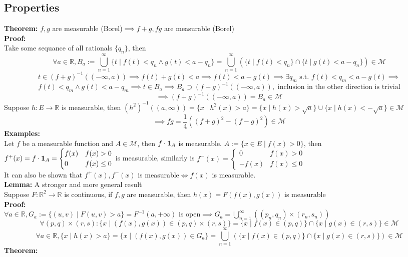 \documentclass{article}
\newcommand{\R}{\mathbb{R}}
\newcommand{\cupninf}{\bigcup\limits_{n=1}^\infty}
\newcommand{\st}{\mbox{ s.t. }}
\newcommand{\0}{{\bf{0}}}
\newcommand{\1}{{\bf{1}}}
\begin{document}
\subsection{Properties}
\textbf{Theorem:} $f,g$ are measurable (Borel)$\implies f+g,fg$ are measurable (Borel)\\
\textbf{Proof:}\\
Take some sequance of all rationals $\{q_n\}$, then
$$\forall a\in\R,B_a:=\cupninf\{t\mid f(t)<q_n\land g(t)<a-q_n\}=\cupninf(\{t\mid f(t)<q_n\}\cap\{t\mid g(t)<a-q_n\})\in\mathcal{M}$$
$$t\in (f+g)^{-1}((-\infty,a))\implies f(t)+g(t)<a\implies f(t)<a-g(t)\implies\exists q_m\st f(t)<q_m<a-g(t)\implies$$
$$f(t)<q_m\land g(t)<a-q_m\implies t\in B_a\implies B_a\supset(f+g)^{-1}((-\infty,a)),\mbox{ inclusion in the other direction is trivial}$$
$$\implies (f+g)^{-1}((-\infty,a))=B_a\in\mathcal{M}$$
Suppose $h:E\to\R$ is measurable, then $\left(h^2\right)^{-1}((a,\infty))=\{x\mid h^2(x)>a\}=\{x\mid h(x)>\sqrt{a}\}\cup\{x\mid h(x)<-\sqrt{a}\}\in\mathcal{M}$
$$\implies fg=\frac{1}{4}\left((f+g)^2-(f-g)^2\right)\in\mathcal{M}$$
\textbf{Examples:}\\
Let $f$ be a measurable function and $A\in\mathcal{M}$, then $f\cdot\1_A$ is measurable. $A:=\{x\in E\mid f(x)>0\}$, then\\
$f^+(x)=f\cdot\1_A=\begin{cases}
    f(x)&f(x)>0\\
    0&f(x)\le0
\end{cases}$ is measurable, similarly is $f^-(x)=\begin{cases}
    0&f(x)>0\\
    -f(x)&f(x)\le0
\end{cases}$\\
It can also be shown that $f^+(x),f^-(x)$ is measurable$\iff f(x)$ is measurable.\\
\textbf{Lemma:} A stronger and more general result\\
Suppose $F:\R^2\to\R$ is continuous, if $f,g$ are measurable, then $h(x)=F(f(x),g(x))$ is measurable\\
\textbf{Proof:}\\
$\forall a\in\R,G_a:=\{(u,v)\mid F(u,v)>a\}=F^{-1}(a,+\infty)$ is open$\implies G_a=\cupninf((p_n,q_n)\times(r_n,s_n))$
$$\forall (p,q)\times(r,s):\{x\mid (f(x),g(x))\in(p,q)\times(r,s)\}=\{x\mid f(x)\in(p,q)\}\cap\{x\mid g(x)\in(r,s)\}\in\mathcal{M}$$
$$\forall a\in\R,\{x\mid h(x)>a\}=\{x\mid (f(x),g(x))\in G_a\}=\cupninf(\{x\mid f(x)\in(p,q)\}\cap\{x\mid g(x)\in(r,s)\})\in\mathcal{M}$$
\textbf{Theorem:}\\
\end{document}
